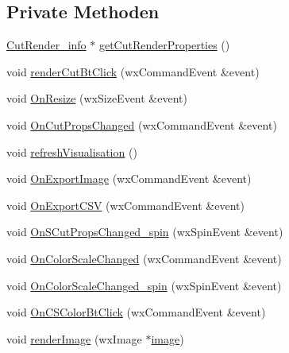 \subsection*{Private Methoden}
\begin{DoxyCompactItemize}
\item 
\hyperlink{structUtils_1_1CutRender__info}{Cut\-Render\-\_\-info} $\ast$ \hyperlink{classGUICutRenderWindow_a01c347a6ff7868df925e46e48fc1a289}{get\-Cut\-Render\-Properties} ()
\item 
void \hyperlink{classGUICutRenderWindow_a7cd1bfbec53756a1cbbe1616b4d46c7a}{render\-Cut\-Bt\-Click} (wx\-Command\-Event \&event)
\item 
void \hyperlink{classGUICutRenderWindow_ab57ff6c0d5e6465bb0f3b5cf0e6d9dc9}{On\-Resize} (wx\-Size\-Event \&event)
\item 
void \hyperlink{classGUICutRenderWindow_a780972413c43b3086e86c28d581d1f70}{On\-Cut\-Props\-Changed} (wx\-Command\-Event \&event)
\item 
void \hyperlink{classGUICutRenderWindow_a525891e3dde6ffd445bfed747dcee970}{refresh\-Visualisation} ()
\item 
void \hyperlink{classGUICutRenderWindow_a97f4602acc61f4b62c4d90ddbb692a25}{On\-Export\-Image} (wx\-Command\-Event \&event)
\item 
void \hyperlink{classGUICutRenderWindow_a3aee786d94c840ab4e6df6e3c2817802}{On\-Export\-C\-S\-V} (wx\-Command\-Event \&event)
\item 
void \hyperlink{classGUICutRenderWindow_a50e92af9db469de6d0298e58eee783ce}{On\-S\-Cut\-Props\-Changed\-\_\-spin} (wx\-Spin\-Event \&event)
\item 
void \hyperlink{classGUICutRenderWindow_a25feed7d1598253a25fc9c3bfe4131ec}{On\-Color\-Scale\-Changed} (wx\-Command\-Event \&event)
\item 
void \hyperlink{classGUICutRenderWindow_a3a2c47b00b30661632dae29eed266438}{On\-Color\-Scale\-Changed\-\_\-spin} (wx\-Spin\-Event \&event)
\item 
void \hyperlink{classGUICutRenderWindow_a0923a36cdf4e0094d78f623693ff8ac6}{On\-C\-S\-Color\-Bt\-Click} (wx\-Command\-Event \&event)
\item 
void \hyperlink{classGUICutRenderWindow_a9eedb7088ad31f4680a77ed3a06fa60c}{render\-Image} (wx\-Image $\ast$\hyperlink{classGUICutRenderWindow_a30c36db74a83fc5523407d3611c1db34}{image})
\end{DoxyCompactItemize}
